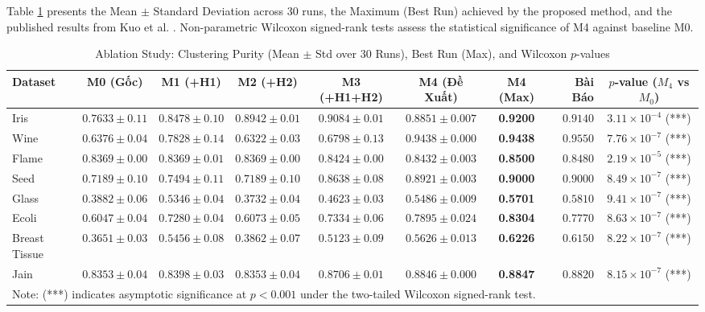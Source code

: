 \documentclass[preprint,12pt]{elsarticle}
\begin{document}
Table \ref{tab:ablation} presents the Mean $\pm$ Standard Deviation across 30 runs, the Maximum (Best Run) achieved by the proposed method, and the published results from Kuo et al. \cite{kuo2023density}. Non-parametric Wilcoxon signed-rank tests assess the statistical significance of M4 against baseline M0.

\begin{table}[htbp]
\centering
\small
\caption{Ablation Study: Clustering Purity (Mean $\pm$ Std over 30 Runs), Best Run (Max), and Wilcoxon $p$-values}
\label{tab:ablation}
\begin{tabular}{lccccccrc}
\toprule
Dataset & M0 (Gốc) & M1 (+H1) & M2 (+H2) & M3 (+H1+H2) & M4 (Đề Xuất) & M4 (Max) & Bài Báo & $p$-value ($M_4$ vs $M_0$) \\
\midrule
Iris          & $0.7633 \pm 0.11$ & $0.8478 \pm 0.10$ & $0.8942 \pm 0.01$ & $0.9084 \pm 0.01$ & $\mathbf{0.8851 \pm 0.007}$ & \textbf{0.9200} & $0.9140$ & $3.11 \times 10^{-4}$ (***) \\
Wine          & $0.6376 \pm 0.04$ & $0.7828 \pm 0.14$ & $0.6322 \pm 0.03$ & $0.6798 \pm 0.13$ & $\mathbf{0.9438 \pm 0.000}$ & \textbf{0.9438} & $0.9550$ & $7.76 \times 10^{-7}$ (***) \\
Flame         & $0.8369 \pm 0.00$ & $0.8369 \pm 0.01$ & $0.8369 \pm 0.00$ & $0.8424 \pm 0.00$ & $\mathbf{0.8432 \pm 0.003}$ & \textbf{0.8500} & $0.8480$ & $2.19 \times 10^{-5}$ (***) \\
Seed          & $0.7189 \pm 0.10$ & $0.7494 \pm 0.11$ & $0.7189 \pm 0.10$ & $0.8638 \pm 0.08$ & $\mathbf{0.8921 \pm 0.003}$ & \textbf{0.9000} & $0.9000$ & $8.49 \times 10^{-7}$ (***) \\
Glass         & $0.3882 \pm 0.06$ & $0.5346 \pm 0.04$ & $0.3732 \pm 0.04$ & $0.4623 \pm 0.03$ & $\mathbf{0.5486 \pm 0.009}$ & \textbf{0.5701} & $0.5810$ & $9.41 \times 10^{-7}$ (***) \\
Ecoli         & $0.6047 \pm 0.04$ & $0.7280 \pm 0.04$ & $0.6073 \pm 0.05$ & $0.7334 \pm 0.06$ & $\mathbf{0.7895 \pm 0.024}$ & \textbf{0.8304} & $0.7770$ & $8.63 \times 10^{-7}$ (***) \\
Breast Tissue & $0.3651 \pm 0.03$ & $0.5456 \pm 0.08$ & $0.3862 \pm 0.07$ & $0.5123 \pm 0.09$ & $\mathbf{0.5626 \pm 0.013}$ & \textbf{0.6226} & $0.6150$ & $8.22 \times 10^{-7}$ (***) \\
Jain          & $0.8353 \pm 0.04$ & $0.8398 \pm 0.03$ & $0.8353 \pm 0.04$ & $0.8706 \pm 0.01$ & $\mathbf{0.8846 \pm 0.000}$ & \textbf{0.8847} & $0.8820$ & $8.15 \times 10^{-7}$ (***) \\
\bottomrule
\multicolumn{9}{l}{\footnotesize Note: (***) indicates asymptotic significance at $p < 0.001$ under the two-tailed Wilcoxon signed-rank test.}
\end{tabular}
\end{table}
\end{document}
